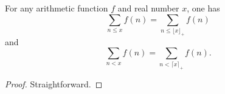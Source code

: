 \begin{lemma}
\label{finsum_range_eq_sum_range}
\leanok
For any arithmetic function $f$ and real number $x$, one has
  $$ \sum_{n \leq x} f(n) = \sum_{n \leq ⌊x⌋_+} f(n)$$
  and
  $$ \sum_{n < x} f(n) = \sum_{n < ⌈x⌉_+} f(n).$$
\end{lemma}
\begin{proof}
\leanok
Straightforward.
\end{proof}
